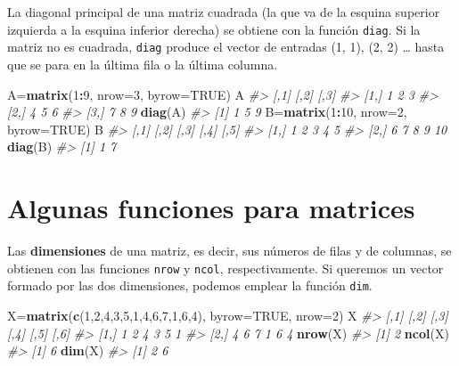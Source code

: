\documentclass[
]{book}
\newenvironment{Shaded}{\begin{snugshade}}{\end{snugshade}}
\newcommand{\CommentTok}[1]{\textcolor[rgb]{0.56,0.35,0.01}{\textit{#1}}}
\newcommand{\DataTypeTok}[1]{\textcolor[rgb]{0.13,0.29,0.53}{#1}}
\newcommand{\DecValTok}[1]{\textcolor[rgb]{0.00,0.00,0.81}{#1}}
\newcommand{\KeywordTok}[1]{\textcolor[rgb]{0.13,0.29,0.53}{\textbf{#1}}}
\newcommand{\NormalTok}[1]{#1}
\newcommand{\OperatorTok}[1]{\textcolor[rgb]{0.81,0.36,0.00}{\textbf{#1}}}
\newcommand{\OtherTok}[1]{\textcolor[rgb]{0.56,0.35,0.01}{#1}}
\theoremstyle{definition}
\theoremstyle{definition}
\theoremstyle{definition}
\theoremstyle{remark}
\begin{document}
La diagonal principal de una matriz cuadrada (la que va de la esquina superior izquierda a la esquina inferior derecha) se obtiene con la función \texttt{diag}. Si la matriz no es cuadrada, \texttt{diag} produce el vector de entradas (1, 1), (2, 2) \ldots{} hasta que se para en la última fila o la última columna.

\begin{Shaded}
\begin{Highlighting}[]
\NormalTok{A=}\KeywordTok{matrix}\NormalTok{(}\DecValTok{1}\OperatorTok{:}\DecValTok{9}\NormalTok{, }\DataTypeTok{nrow=}\DecValTok{3}\NormalTok{, }\DataTypeTok{byrow=}\OtherTok{TRUE}\NormalTok{)}
\NormalTok{A }
\CommentTok{\#\textgreater{}      [,1] [,2] [,3]}
\CommentTok{\#\textgreater{} [1,]    1    2    3}
\CommentTok{\#\textgreater{} [2,]    4    5    6}
\CommentTok{\#\textgreater{} [3,]    7    8    9}
\KeywordTok{diag}\NormalTok{(A)}
\CommentTok{\#\textgreater{} [1] 1 5 9}
\NormalTok{B=}\KeywordTok{matrix}\NormalTok{(}\DecValTok{1}\OperatorTok{:}\DecValTok{10}\NormalTok{, }\DataTypeTok{nrow=}\DecValTok{2}\NormalTok{, }\DataTypeTok{byrow=}\OtherTok{TRUE}\NormalTok{)}
\NormalTok{B}
\CommentTok{\#\textgreater{}      [,1] [,2] [,3] [,4] [,5]}
\CommentTok{\#\textgreater{} [1,]    1    2    3    4    5}
\CommentTok{\#\textgreater{} [2,]    6    7    8    9   10}
\KeywordTok{diag}\NormalTok{(B)}
\CommentTok{\#\textgreater{} [1] 1 7}
\end{Highlighting}
\end{Shaded}

\hypertarget{algunas-funciones-para-matrices}{%
\section{Algunas funciones para matrices}\label{algunas-funciones-para-matrices}}

Las \textbf{dimensiones} de una matriz, es decir, sus números de filas y de columnas, se obtienen con las funciones \texttt{nrow} y \texttt{ncol}, respectivamente. Si queremos un vector formado por las dos dimensiones, podemos emplear la función \texttt{dim}.

\begin{Shaded}
\begin{Highlighting}[]
\NormalTok{X=}\KeywordTok{matrix}\NormalTok{(}\KeywordTok{c}\NormalTok{(}\DecValTok{1}\NormalTok{,}\DecValTok{2}\NormalTok{,}\DecValTok{4}\NormalTok{,}\DecValTok{3}\NormalTok{,}\DecValTok{5}\NormalTok{,}\DecValTok{1}\NormalTok{,}\DecValTok{4}\NormalTok{,}\DecValTok{6}\NormalTok{,}\DecValTok{7}\NormalTok{,}\DecValTok{1}\NormalTok{,}\DecValTok{6}\NormalTok{,}\DecValTok{4}\NormalTok{), }\DataTypeTok{byrow=}\OtherTok{TRUE}\NormalTok{, }\DataTypeTok{nrow=}\DecValTok{2}\NormalTok{)}
\NormalTok{X}
\CommentTok{\#\textgreater{}      [,1] [,2] [,3] [,4] [,5] [,6]}
\CommentTok{\#\textgreater{} [1,]    1    2    4    3    5    1}
\CommentTok{\#\textgreater{} [2,]    4    6    7    1    6    4}
\KeywordTok{nrow}\NormalTok{(X)}
\CommentTok{\#\textgreater{} [1] 2}
\KeywordTok{ncol}\NormalTok{(X)}
\CommentTok{\#\textgreater{} [1] 6}
\KeywordTok{dim}\NormalTok{(X)}
\CommentTok{\#\textgreater{} [1] 2 6}
\end{Highlighting}
\end{Shaded}
\end{document}
